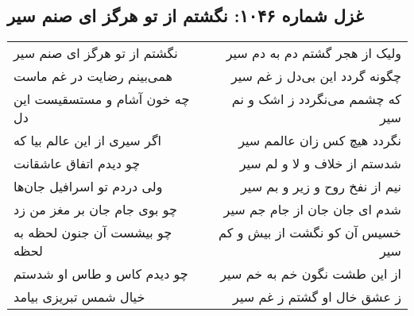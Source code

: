 \begin{center}
\section*{غزل شماره ۱۰۴۶: نگشتم از تو هرگز ای صنم سیر}
\label{sec:1046}
\begin{longtable}{l p{0.5cm} r}
نگشتم از تو هرگز ای صنم سیر
&&
ولیک از هجر گشتم دم به دم سیر
\\
همی‌بینم رضایت در غم ماست
&&
چگونه گردد این بی‌دل ز غم سیر
\\
چه خون آشام و مستسقیست این دل
&&
که چشمم می‌نگردد ز اشک و نم سیر
\\
اگر سیری از این عالم بیا که
&&
نگردد هیچ کس زان عالمم سیر
\\
چو دیدم اتفاق عاشقانت
&&
شدستم از خلاف و لا و لم سیر
\\
ولی دردم تو اسرافیل جان‌ها
&&
نیم از نفخ روح و زیر و بم سیر
\\
چو بوی جام جان بر مغز من زد
&&
شدم ای جان جان از جام جم سیر
\\
چو بیشست آن جنون لحظه به لحظه
&&
خسیس آن کو نگشت از بیش و کم سیر
\\
چو دیدم کاس و طاس او شدستم
&&
از این طشت نگون خم به خم سیر
\\
خیال شمس تبریزی بیامد
&&
ز عشق خال او گشتم ز غم سیر
\\
\end{longtable}
\end{center}
